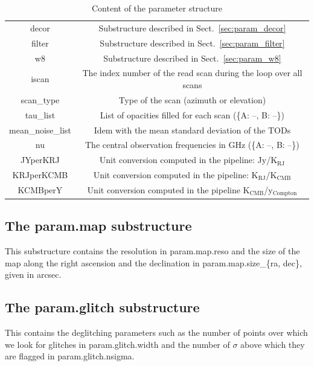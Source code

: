 \documentclass[a4paper]{article}
\begin{document}
\begin{table}[!h]
\begin{center}
\begin{tabular}{cc}
           decor & Substructure described in Sect.~\ref{sec:param_decor} \\
           filter & Substructure described in Sect.~\ref{sec:param_filter} \\
           w8 & Substructure described in Sect.~\ref{sec:param_w8} \\
           iscan & The index number of the read scan during the loop over all scans \\
           scan\_type & Type of the scan (azimuth or elevation) \\
           tau\_list & List of opacities filled for each scan (\{A: --, B: --\}) \\
           mean\_noise\_list & Idem with the mean standard deviation of the TODs \\
           nu & The central observation frequencies in GHz (\{A: --, B: --\}) \\
           JYperKRJ & Unit conversion computed in the pipeline: Jy/K$_{\mathrm{RJ}}$ \\
           KRJperKCMB & Unit conversion computed in the pipeline: K$_{\mathrm{RJ}}$/K$_{\mathrm{CMB}}$ \\
           KCMBperY & Unit conversion computed in the pipeline K$_{\mathrm{CMB}}$/y$_{\mathrm{Compton}}$ \\
	\hline
	\end{tabular}
	\end{center}
	\caption{Content of the parameter structure}
	\label{tab:table_param}
	\end{table}

\subsection{The param.map substructure }
\label{sec:param_map}
This substructure contains the resolution in {\color{blue} param.map.reso} and the size of the map along the right ascension and the declination in {\color{blue} param.map.size\_\{ra, dec\}}, given in arcsec.

\subsection{The param.glitch substructure }
\label{sec:param_glitch}
This contains the deglitching parameters such as the number of points over which we look for glitches in {\color{blue} param.glitch.width} and the number of $\sigma$ above which they are flagged in {\color{blue} param.glitch.nsigma}.
\end{document}
